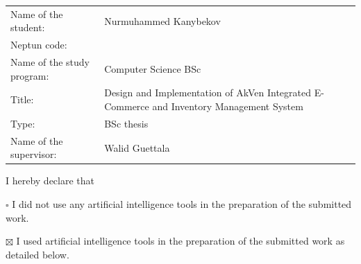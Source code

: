 \clearpage
{}
{}
\thispagestyle{plain}
\par\medskip

{\small\linespread{1.0}\selectfont\setlength{\parindent}{0pt}
\begin{tabular}{@{}l p{9.2cm}@{}}
	Name of the student: & Nurmuhammed Kanybekov \\
	Neptun code: & \neptuncode \\
	Name of the study program: & Computer Science BSc \\
	Title: & Design and Implementation of AkVen Integrated E-Commerce and Inventory Management System \\
	Type: & BSc thesis \\
	Name of the supervisor: & Walid Guettala \\
\end{tabular}

\smallskip
I hereby declare that

$\square$ I did not use any artificial intelligence tools in the preparation of the submitted work.

$\boxtimes$ I used artificial intelligence tools in the preparation of the submitted work as detailed below.

}
